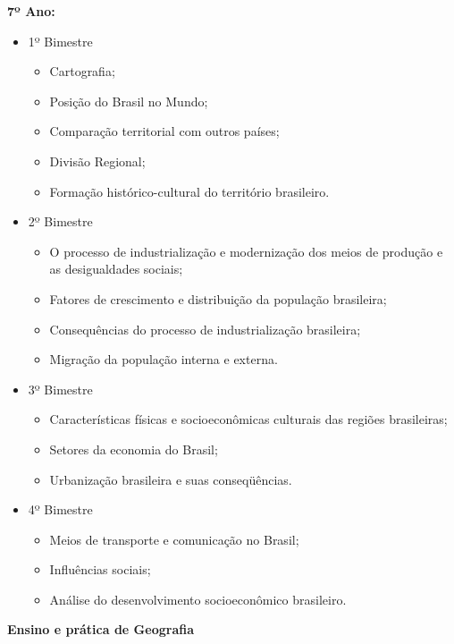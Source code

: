 \textbf{7º Ano:}
\begin{itemize}
\item 1º Bimestre
\begin{itemize}
\item Cartografia;
\item Posição do Brasil no Mundo; 
\item Comparação territorial com outros países;
\item Divisão Regional;
\item Formação histórico-cultural do território brasileiro.
\end{itemize}
\end{itemize}
\begin{itemize}
\item 2º Bimestre
\begin{itemize}
\item O processo de industrialização e modernização dos meios de produção e as desigualdades sociais; 
\item Fatores de crescimento e distribuição da população brasileira; 
\item Consequências do processo de industrialização brasileira; 
\item Migração da população interna e externa.
\end{itemize}
\end{itemize}
\begin{itemize}
\item 3º Bimestre
\begin{itemize}
\item Características físicas e socioeconômicas culturais das regiões brasileiras;
\item Setores da economia do Brasil; 
\item Urbanização brasileira e suas conseqüências.
\end{itemize}
\end{itemize}
\begin{itemize}
\item 4º Bimestre
\begin{itemize}
\item Meios de transporte e comunicação no Brasil; 
\item Influências sociais; 
\item Análise do desenvolvimento socioeconômico brasileiro.
\end{itemize}
\end{itemize}

\textbf{Ensino e prática de Geografia}\\

